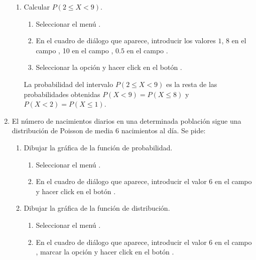 \begin{enumerate}[leftmargin=*]
\begin{enumerate}
\item Calcular $P(2\leq X < 9)$.
\begin{indicacion}{
\begin{enumerate}
\item Seleccionar el menú .
\item En el cuadro de diálogo que aparece, introducir los valores $1$, $8$ en el campo , 10 en el campo
, $0.5$ en el campo .
\item Seleccionar la opción  y hacer click en el botón .
\end{enumerate}
La probabilidad del intervalo $P(2\leq X<9)$ es la resta de las probabilidades obtenidas $P(X<9)=P(X\leq 8)$ y $P(X<2)=P(X\leq 1)$.
}
\end{indicacion}
\end{enumerate}


\item El número de nacimientos diarios en una determinada población sigue una distribución de Poisson de media 6
nacimientos al día. Se pide:
\begin{enumerate}
\item Dibujar la gráfica de la función de probabilidad.
\begin{indicacion}{
\begin{enumerate}
\item Seleccionar el menú .
\item En el cuadro de diálogo que aparece, introducir el valor 6 en el campo  y hacer click en el botón
.
\end{enumerate}}
\end{indicacion}

\item Dibujar la gráfica de la función de distribución.
\begin{indicacion}{
\begin{enumerate}
\item Seleccionar el menú .
\item En el cuadro de diálogo que aparece, introducir el valor 6 en el campo , marcar la opción
 y hacer click en el botón .
\end{enumerate}}
\end{indicacion}


\end{enumerate}
\end{enumerate}
